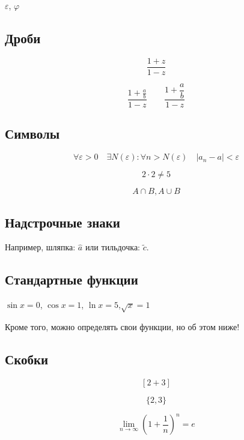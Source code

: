 \documentclass[12pt, a4paper]{article}
\begin{document}
$\varepsilon$, $\varphi$


\subsection{Дроби}

\[\frac{1 + z}{1 - z}\]

\[\frac{1 + \frac{a}{b}}{1 - z} \qquad \frac{1 + \dfrac{a}{b}}{1 - z}\]

\subsection{Символы}

\[ \forall \varepsilon > 0 \quad  \exists N(\varepsilon) : \forall n > N(\varepsilon) \quad |a_n - a| < \varepsilon \]

\[ 2 \cdot 2 \ne 5 \]

\[ A \cap B, A \cup B \]


\subsection{Надстрочные знаки}

Например, шляпка: $\hat{a}$ или тильдочка: $\tilde{c}$.

\subsection{Стандартные функции}

$\sin x = 0$, $\cos x = 1$, $\ln x = 5$,$\sqrt x = 1$

Кроме того, можно определять свои функции, но об этом ниже!


\subsection{Скобки}

\[  [2+3]  \]

\[ \{2,3\} \]

\[\lim_{n \to \infty} \left(1+\frac{1}{n}\right)^n = e \]


\end{document}
